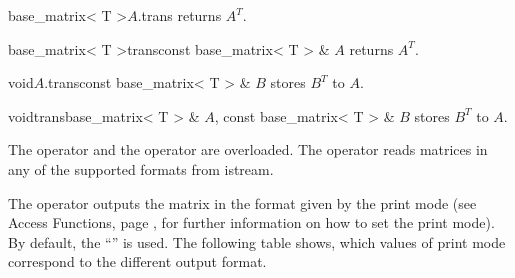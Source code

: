 

\begin{cfcode}{base_matrix< T >}{$A$.trans}{}
  returns $A^T$.
\end{cfcode}

\begin{fcode}{base_matrix< T >}{trans}{const base_matrix< T > & $A$}
  returns $A^T$.
\end{fcode}

\begin{fcode}{void}{$A$.trans}{const base_matrix< T > & $B$}
  stores $B^T$ to $A$.
\end{fcode}

\begin{fcode}{void}{trans}{base_matrix< T > & $A$, const base_matrix< T > & $B$}
  stores $B^T$ to $A$.
\end{fcode}



\IO

\label{base_matrix_io}
The  operator \code{>>} and the  operator \code{<<} are overloaded.
The  operator \code{>>} reads matrices in any of the supported formats from
istream.

The  operator \code{<<} outputs the matrix in the format given by the print mode
(see Access Functions, page \pageref{base_matrix_access}, for further information on how to set
the print mode).  By default, the ``'' is used.  The following table shows,
which values of print mode correspond to the different output format.

